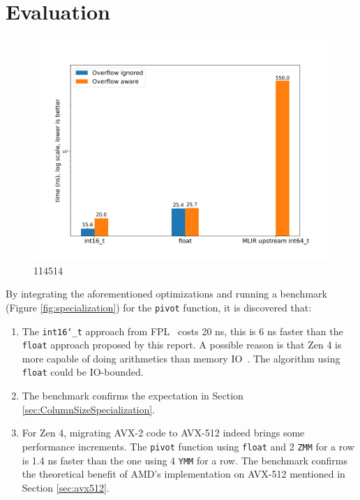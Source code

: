 \documentclass[logo,bsc,singlespacing,parskip]{infthesis}
\newcommand{\dtshort}{\texttt{int16\char`_t}}
\newcommand{\dtfloat}{\texttt{float}}
\newcommand{\pivot}{\texttt{pivot}}
\newcommand{\ymm}{\texttt{YMM}}
\newcommand{\zmm}{\texttt{ZMM}}
\begin{document}
\section{Evaluation}
\begin{figure}[H]
    \begin{center}
        \includegraphics[width=\linewidth]{image/i16-3ymmf32-upstream-overflow.png}
    \end{center}
    \caption{ 114514
    }
    \label{fig:i16-3ymmf32-upstream-overflow}
\end{figure}


By integrating the aforementioned optimizations and running a benchmark (Figure
\ref{fig:specialization}) for the \pivot{} function, it is discovered that:
\begin{enumerate}
    \item The \dtshort{} approach from FPL~\cite{FPL2} costs 20 ns, this is 6 ns
    faster than the \dtfloat{} approach proposed by this report. A possible
    reason is that Zen 4 is more capable of doing arithmetics than memory
    IO~\cite{Zen4Critique}. The algorithm using \dtfloat{} could be IO-bounded. 
    \item The benchmark confirms the expectation in Section
    \ref{sec:ColumnSizeSpecialization}.
    \item For Zen 4, migrating AVX-2 code to AVX-512 indeed
    brings some performance increments. The \pivot{} function using \dtfloat{}
    and 2 \zmm{} for a row is 1.4 ns faster than the one using 4 \ymm{} for a
    row. The benchmark confirms the theoretical benefit of AMD's implementation
    on AVX-512 mentioned in Section \ref{sec:avx512}.

\end{enumerate}
\end{document}
